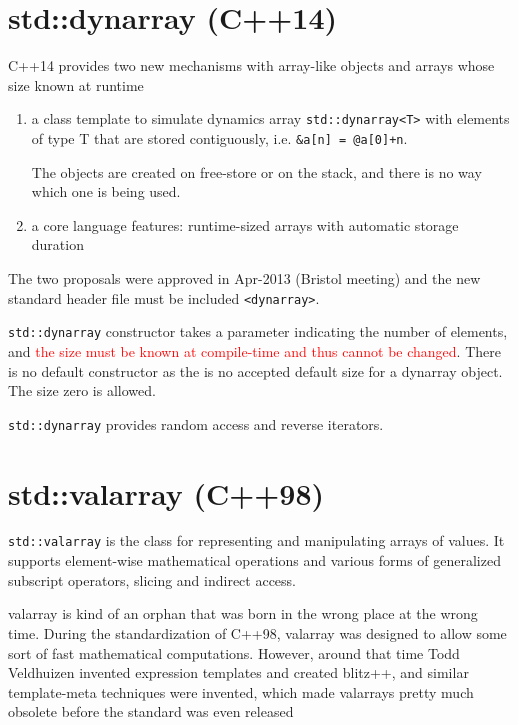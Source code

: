\section{std::dynarray (C++14)}
\label{sec:dynarray-C++14}

C++14 provides two new mechanisms with array-like objects and arrays whose size
known at runtime
\begin{enumerate}
  \item a class template to simulate dynamics array \verb!std::dynarray<T>! with
  elements of type T that are stored contiguously, i.e. \verb!&a[n] = @a[0]+n!.
  
  The objects are created on free-store or on the stack, and there is no way
  which one is being used.
  
  
  \item a core language features: runtime-sized arrays with automatic storage
  duration
\end{enumerate}
The two proposals were approved in Apr-2013 (Bristol meeting) and the new
standard header file must be included \verb!<dynarray>!.

\verb!std::dynarray! constructor takes a parameter indicating the number of
elements, and \textcolor{red}{the size must be known at compile-time and thus
cannot be changed}. There is no default constructor as the is no accepted
default size for a dynarray object. The size zero is allowed.

\verb!std::dynarray! provides random access and reverse iterators. 

\section{std::valarray (C++98)}
\label{sec:std::valarray}

\verb!std::valarray! is the class for representing and manipulating arrays of values.
It supports element-wise mathematical operations and various forms of
generalized subscript operators, slicing and indirect access.


valarray is kind of an orphan that was born in the wrong place at the wrong
time. During the standardization of C++98, valarray was designed to allow some
sort of fast mathematical computations. However, around that time Todd
Veldhuizen invented expression templates and created blitz++, and similar
template-meta techniques were invented, which made valarrays pretty much
obsolete before the standard was even released


